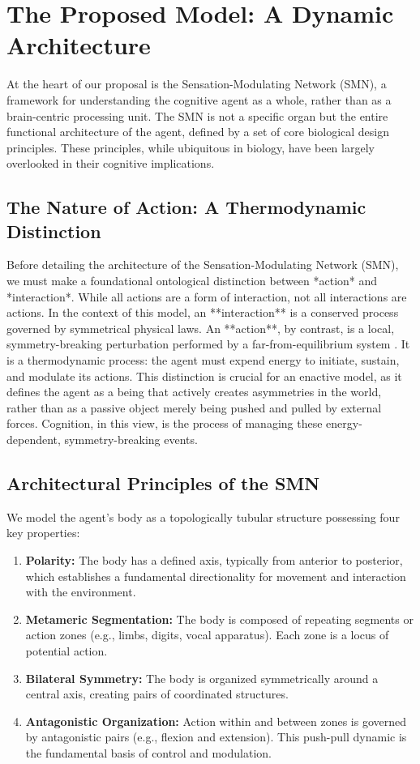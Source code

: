 \section{The Proposed Model: A Dynamic Architecture}
\label{sec:model}
At the heart of our proposal is the Sensation-Modulating Network (SMN), a framework for understanding the cognitive agent as a whole, rather than as a brain-centric processing unit. The SMN is not a specific organ but the entire functional architecture of the agent, defined by a set of core biological design principles. These principles, while ubiquitous in biology, have been largely overlooked in their cognitive implications.

\subsection{The Nature of Action: A Thermodynamic Distinction}
\label{subsec:action_nature}
Before detailing the architecture of the Sensation-Modulating Network (SMN), we must make a foundational ontological distinction between *action* and *interaction*. While all actions are a form of interaction, not all interactions are actions. In the context of this model, an **interaction** is a conserved process governed by symmetrical physical laws. An **action**, by contrast, is a local, symmetry-breaking perturbation performed by a far-from-equilibrium system \cite{prigogine2018order}. It is a thermodynamic process: the agent must expend energy to initiate, sustain, and modulate its actions. This distinction is crucial for an enactive model, as it defines the agent as a being that actively creates asymmetries in the world, rather than as a passive object merely being pushed and pulled by external forces. Cognition, in this view, is the process of managing these energy-dependent, symmetry-breaking events.

\subsection{Architectural Principles of the SMN}
\label{subsec:architectural_principles}
We model the agent's body as a topologically tubular structure possessing four key properties:
\begin{enumerate}
    \item \textbf{Polarity:} The body has a defined axis, typically from anterior to posterior, which establishes a fundamental directionality for movement and interaction with the environment.
    \item \textbf{Metameric Segmentation:} The body is composed of repeating segments or action zones (e.g., limbs, digits, vocal apparatus). Each zone is a locus of potential action.
    \item \textbf{Bilateral Symmetry:} The body is organized symmetrically around a central axis, creating pairs of coordinated structures.
    \item \textbf{Antagonistic Organization:} Action within and between zones is governed by antagonistic pairs (e.g., flexion and extension). This push-pull dynamic is the fundamental basis of control and modulation.
\end{enumerate}

